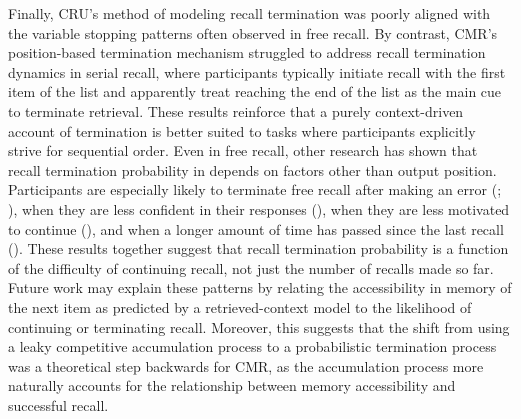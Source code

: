 \documentclass[
  man,
  floatsintext,
  longtable,
  nolmodern,
  notxfonts,
  notimes,
  draftfirst,
  colorlinks=true,linkcolor=blue,citecolor=blue,urlcolor=blue]{apa7}
\begin{document}
Finally, CRU's method of modeling recall termination was poorly aligned
with the variable stopping patterns often observed in free recall. By
contrast, CMR's position-based termination mechanism struggled to
address recall termination dynamics in serial recall, where participants
typically initiate recall with the first item of the list and apparently
treat reaching the end of the list as the main cue to terminate
retrieval. These results reinforce that a purely context-driven account
of termination is better suited to tasks where participants explicitly
strive for sequential order. Even in free recall, other research has
shown that recall termination probability in depends on factors other
than output position. Participants are especially likely to terminate
free recall after making an error
(;
), when they
are less confident in their responses
(), when they
are less motivated to continue
(),
and when a longer amount of time has passed since the last recall
().
These results together suggest that recall termination probability is a
function of the difficulty of continuing recall, not just the number of
recalls made so far. Future work may explain these patterns by relating
the accessibility in memory of the next item as predicted by a
retrieved-context model to the likelihood of continuing or terminating
recall. Moreover, this suggests that the shift from using a leaky
competitive accumulation process to a probabilistic termination process
was a theoretical step backwards for CMR, as the accumulation process
more naturally accounts for the relationship between memory
accessibility and successful recall.
\end{document}
